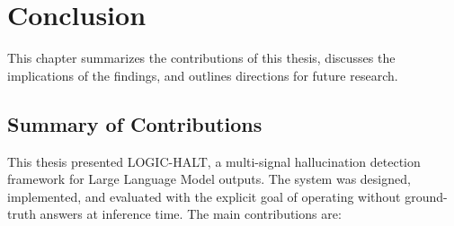 \chapter{Conclusion}

This chapter summarizes the contributions of this thesis, discusses the implications of the findings, and outlines directions for future research.

\section{Summary of Contributions}

This thesis presented LOGIC-HALT, a multi-signal hallucination detection framework for Large Language Model outputs. The system was designed, implemented, and evaluated with the explicit goal of operating without ground-truth answers at inference time. The main contributions are:

